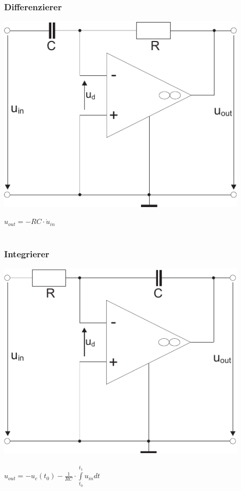 \documentclass[a4paper,twocolumn,10pt]{article}
\begin{document}
\subsubsection*{Differenzierer}
\begin{minipage}[b]{0.3\textwidth}
\includegraphics[width=0.9\textwidth]{Grafiken/OP_Diff}
\end{minipage}
\hfill
\begin{minipage}[b]{0.16\textwidth}
$u_{out}=-RC\cdot \dot{u}_{in}$\\\\
\end{minipage}

\subsubsection*{Integrierer}
\begin{minipage}[b]{0.3\textwidth}
\includegraphics[width=0.9\textwidth]{Grafiken/OP_Int}\\\\
$u_{out}=-u_c(t_0)-\frac{1}{RC}\cdot \int\limits_{t_0}^{t_1}u_{in}dt$
\end{minipage}
\end{document}
